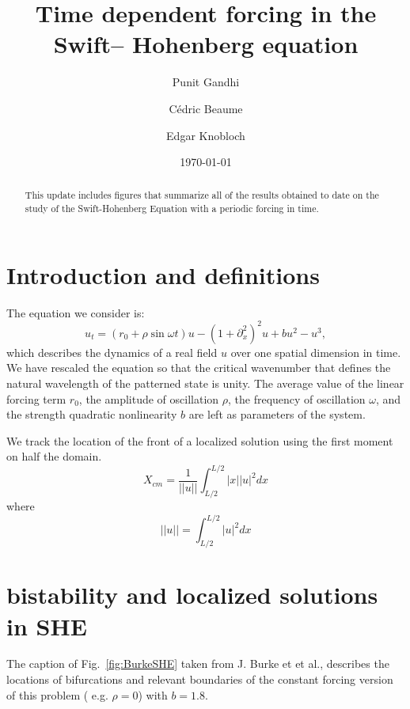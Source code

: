 \documentclass[pre,preprint,superscriptaddress]{revtex4-1}
\begin{document}
\title{Time dependent forcing in the Swift-- Hohenberg equation}
\author{Punit Gandhi}
\author{C\'edric Beaume}
\author{Edgar Knobloch}
\date{\today}

\begin{abstract}
This update includes figures that summarize all of the results obtained to date on the study of the Swift-Hohenberg Equation with a periodic forcing in time.  
\end{abstract}

\maketitle

\section{Introduction and definitions}
The equation we consider is: 
\begin{equation}
u_t= (r_0+ \rho \sin\omega t) u-\left(1+\partial_{x}^2\right)^2u+b u^2-u^3\label{eq:SHtd},
\end{equation}
which describes the dynamics of a real field $u$ over one spatial dimension in time.  We have rescaled the equation so that the critical wavenumber that defines the natural wavelength of the patterned state is unity.   The average value of the linear forcing term $r_0$, the amplitude of oscillation $\rho$, the frequency of oscillation $\omega$, and the strength quadratic nonlinearity $b$ are left as parameters of the system.

We track the location of the front of a localized solution using the first moment on half the domain.  
\begin{equation}
X_{cm}=\frac{1}{||u||} \int_{L/2}^{L/2}  |x| |u|^2 dx
\end{equation}
where 
\begin{equation}
||u||= \int_{L/2}^{L/2}  |u|^2 dx
\end{equation}


\section{bistability and localized solutions in SHE}
The caption of Fig.~\ref{fig:BurkeSHE}  taken from J. Burke et et al., describes the locations of bifurcations and relevant boundaries of the constant forcing version of this problem ( e.g. $\rho=0$) with $b=1.8$.  
\end{document}
